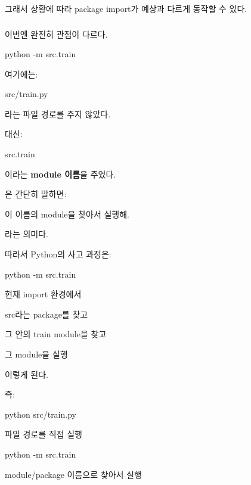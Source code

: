 그래서 상황에 따라 package import가 예상과 다르게 동작할 수 있다.

\subsubsection{}

이번엔 완전히 관점이 다르다.

\begin{dhkzsh}
python -m src.train
\end{dhkzsh}

여기에는:

\begin{dhkzsh}
src/train.py
\end{dhkzsh}

라는 파일 경로를 주지 않았다.

대신:

\begin{dhkzsh}
src.train
\end{dhkzsh}

이라는 \textbf{module 이름}을 주었다.

은 간단히 말하면:

\begin{dhksmry}[centered]
이 이름의 module을 찾아서 실행해.
\end{dhksmry}

라는 의미다.

따라서 Python의 사고 과정은:

\begin{dhksmry}[centered]
python -m src.train

현재 import 환경에서

\da

src라는 package를 찾고

\da

그 안의 train module을 찾고

\da

그 module을 실행
\end{dhksmry}

이렇게 된다.

즉:

\begin{dhksmry}[centered]
python src/train.py

\da

파일 경로를 직접 실행



python -m src.train

\da

module/package 이름으로 찾아서 실행
\end{dhksmry}

